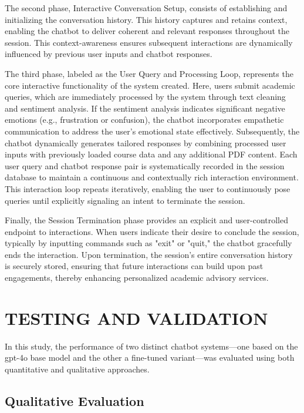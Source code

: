\documentclass[12pt,oneside,openany]{report}
\begin{document}
The second phase, Interactive Conversation Setup, consists of establishing and initializing the conversation history. This history captures and retains context, enabling the chatbot to deliver coherent and relevant responses throughout the session. This context-awareness ensures subsequent interactions are dynamically influenced by previous user inputs and chatbot responses.

The third phase, labeled as the User Query and Processing Loop, represents the core interactive functionality of the system created. Here, users submit academic queries, which are immediately processed by the system through text cleaning and sentiment analysis. If the sentiment analysis indicates significant negative emotions (e.g., frustration or confusion), the chatbot incorporates empathetic communication to address the user's emotional state effectively. Subsequently, the chatbot dynamically generates tailored responses by combining processed user inputs with previously loaded course data and any additional PDF content. Each user query and chatbot response pair is systematically recorded in the session database to maintain a continuous and contextually rich interaction environment. This interaction loop repeats iteratively, enabling the user to continuously pose queries until explicitly signaling an intent to terminate the session.

Finally, the Session Termination phase provides an explicit and user-controlled endpoint to interactions. When users indicate their desire to conclude the session, typically by inputting commands such as "exit" or "quit," the chatbot gracefully ends the interaction. Upon termination, the session’s entire conversation history is securely stored, ensuring that future interactions can build upon past engagements, thereby enhancing personalized academic advisory services.

\chapter{TESTING AND VALIDATION}

In this study, the performance of two distinct chatbot systems—one based on the gpt-4o base model and the other a fine-tuned variant—was evaluated using both quantitative and qualitative approaches.

\section{Qualitative Evaluation}
\end{document}
